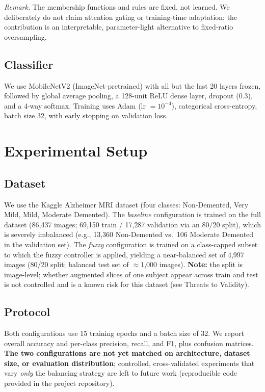 \documentclass[journal]{IEEEtran}
\begin{document}
\noindent\textit{Remark.} The membership functions and rules are fixed, not
learned. We deliberately do not claim attention gating or training-time
adaptation; the contribution is an interpretable, parameter-light alternative to
fixed-ratio oversampling.%

\subsection{Classifier}
We use MobileNetV2 (ImageNet-pretrained) with all but the last 20 layers frozen,
followed by global average pooling, a 128-unit ReLU dense layer, dropout (0.3),
and a 4-way softmax. Training uses Adam (lr $=10^{-4}$), categorical
cross-entropy, batch size 32, with early stopping on validation loss.

\section{Experimental Setup}
\subsection{Dataset}
We use the Kaggle Alzheimer MRI dataset (four classes: Non-Demented, Very Mild,
Mild, Moderate Demented).%
The \emph{baseline} configuration is trained on the full dataset (86{,}437
images; 69{,}150 train / 17{,}287 validation via an 80/20 split), which is
severely imbalanced (e.g., 13{,}360 Non-Demented vs.\ 106 Moderate Demented in
the validation set). The \emph{fuzzy} configuration is trained on a class-capped
subset to which the fuzzy controller is applied, yielding a near-balanced set of
4{,}997 images (80/20 split; balanced test set of $\approx$1{,}000 images).
\textbf{Note:} the split is image-level; whether augmented slices of one subject
appear across train and test is not controlled and is a known risk for this
dataset (see Threats to Validity).

\subsection{Protocol}
Both configurations use 15 training epochs and a batch size of 32. We report
overall accuracy and per-class precision, recall, and F1, plus confusion
matrices. \textbf{The two configurations are not yet matched on architecture,
dataset size, or evaluation distribution}; controlled, cross-validated
experiments that vary \emph{only} the balancing strategy are left to future work
(reproducible code provided in the project repository).
\end{document}
